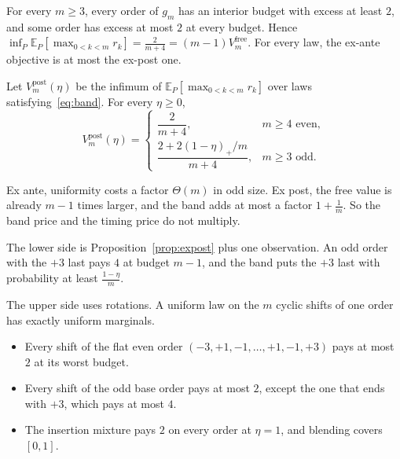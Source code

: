 \begin{proposition}
\label{prop:expost}
For every $m\ge3$, every order of $g_{m}$ has an interior budget with excess at least $2$,
and some order has excess at most $2$ at every budget. Hence
$\inf_{P}\mathbb{E}_{P}[\max_{0<k<m}r_{k}]=\frac{2}{m+4}=(m-1)V^{\mathrm{free}}_{m}$. For
every law, the ex-ante objective is at most the ex-post one.
\end{proposition}


\begin{theorem}
\label{thm:expostband}
Let $V^{\mathrm{post}}_{m}(\eta)$ be the infimum of $\mathbb{E}_{P}[\max_{0<k<m}r_{k}]$ over laws
satisfying~\eqref{eq:band}. For every $\eta\ge0$,
\[
V^{\mathrm{post}}_{m}(\eta)=
\begin{cases}
\dfrac{2}{m+4}, & m\ge4\text{ even},\\[8pt]
\dfrac{2+2(1-\eta)_{+}/m}{m+4}, & m\ge3\text{ odd}.
\end{cases}
\]
\end{theorem}


Ex ante, uniformity costs a factor $\Theta(m)$ in odd size. Ex post, the free value is
already $m-1$ times larger, and the band adds at most a factor $1+\frac1m$. So the band price
and the timing price do not multiply.

The lower side is Proposition~\ref{prop:expost} plus one observation. An odd order with the
$+3$ last pays $4$ at budget $m-1$, and the band puts the $+3$ last with probability at least
$\frac{1-\eta}{m}$.

The upper side uses rotations. A uniform law on the $m$ cyclic shifts of one order has exactly
uniform marginals.
\begin{itemize}
\item Every shift of the flat even order $(-3,+1,-1,\dots,+1,-1,+3)$ pays at most $2$ at its
worst budget.
\item Every shift of the odd base order pays at most $2$, except the one that ends with $+3$,
which pays at most $4$.
\item The insertion mixture pays $2$ on every order at $\eta=1$, and blending covers $[0,1]$.
\end{itemize}

